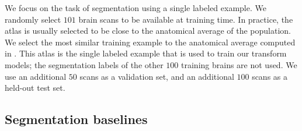\documentclass[10pt,twocolumn,letterpaper]{article}
\begin{document}
We focus on the task of segmentation using a single labeled example. We randomly select $101$ brain scans to be available at training time. In practice, the atlas is usually selected to be close to the anatomical average of the population. We select the most similar training example to the anatomical average computed in \cite{balakrishnan2018unsupervised}. This atlas is the single labeled example that is used to train our transform models; the segmentation labels of the other $100$ training brains are not used. We use an additional $50$ scans as a validation set, and an additional $100$ scans as a held-out test set. 

\subsection{Segmentation baselines}\label{sec:baselines}
\end{document}
